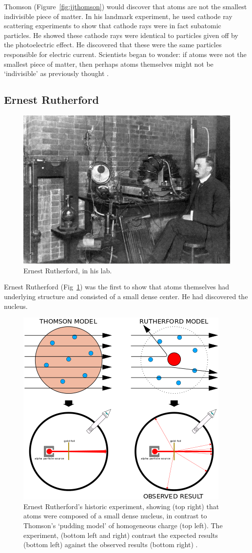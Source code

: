 Thomson (Figure~\ref{fig:jjthomson}) would discover that atoms are not the
smallest indivisible piece of matter. In his landmark experiment, he used
cathode ray scattering experiments to show that cathode rays were in fact
subatomic particles. He showed these cathode rays were identical to particles
given off by the photoelectric effect. He discovered that these were the same
particles responsible for electric current.  Scientists began to wonder: if
atoms were not the smallest piece of matter, then perhaps atoms themselves
might not be `indivisible' as previously thought \cite{nobelthomson2014}.

\subsection{Ernest Rutherford}

\begin{figure}[ht]
	\centering
	\includegraphics[width=0.6\linewidth]{./figures/ernestrutherford.jpg}
	\caption{Ernest Rutherford, in his lab.  \cite{Eve1939}}
	\label{fig:rutherford}
\end{figure}

Ernest Rutherford (Fig~\ref{fig:rutherford}) was the first to show that atoms
themselves had underlying structure and consisted of a small dense center.  He
had discovered the nucleus.

\begin{figure}[ht]
	\centering
	\includegraphics[width=0.6\linewidth]{./figures/geiger_marsden.png}
	\caption{
		Ernest Rutherford's historic experiment, showing (top right) that atoms were
		composed of a small dense nucleus, in contrast to Thomson's `pudding model'
		of homogeneous charge (top left). The experiment, (bottom left and right)
		contrast the expected results (bottom left) against the observed results
		(bottom right)  \cite{Kurzon2014}.
	}
	\label{fig:geigermarsden}
\end{figure}

